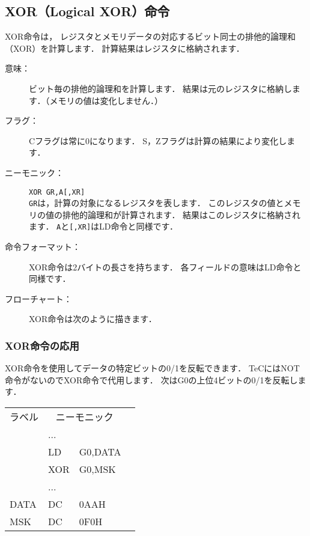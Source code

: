 \begin{center}
\end{center}

\newpage
\subsection{XOR（Logical XOR）命令}
XOR命令は，
レジスタとメモリデータの対応するビット同士の排他的論理和（XOR）を計算します．
計算結果はレジスタに格納されます．

\begin{description}
\item[意味：]ビット毎の排他的論理和を計算します．
結果は元のレジスタに格納します．（メモリの値は変化しません．）

\item[フラグ：]Cフラグは常に0になります．
S，Zフラグは計算の結果により変化します．

\item[ニーモニック：]{\tt XOR  GR,A[,XR]} \\
{\tt GR}は，計算の対象になるレジスタを表します．
このレジスタの値とメモリの値の排他的論理和が計算されます．
結果はこのレジスタに格納されます．
{\tt A}と{\tt [,XR]}はLD命令と同様です．

\item[命令フォーマット：]XOR命令は2バイトの長さを持ちます．
各フィールドの意味はLD命令と同様です．


\item[フローチャート：]XOR命令は次のように描きます．

\begin{center}
\end{center}

\end{description}

\subsubsection{XOR命令の応用}
XOR命令を使用してデータの特定ビットの0/1を反転できます．
TeCにはNOT命令がないのでXOR命令で代用します．
次はG0の上位4ビットの0/1を反転します．

{\tt\small\begin{center}
\begin{tabular}{|l|l l|l}
\cline{1-3}
ラベル & \multicolumn{2}{|c|}{ニーモニック} & \\
\cline{1-3}
    & ...  &        & \\
    & LD   & G0,DATA& \\
    & XOR  & G0,MSK & \\
    & ...  &        & \\
DATA& DC   & 0AAH    & \\
MSK & DC   & 0F0H    & \\
\cline{1-3}
\end{tabular}
\end{center}}

